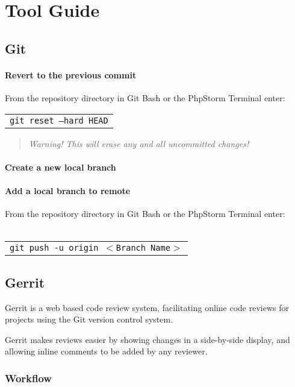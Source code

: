 
\chapter{Tool Guide}

\section{Git}

\subsubsection{Revert to the previous commit}
From the repository directory in Git Bash or the PhpStorm Terminal enter:\\

\begin{tabular}{l}
	\texttt{git reset --hard HEAD}\\
\end{tabular}

\begin{quote}
	\emph{Warning! This will erase any and all uncommitted changes!}
\end{quote}

\subsubsection{Create a new local branch}

\subsubsection{Add a local branch to remote}
From the repository directory in Git Bash or the PhpStorm Terminal enter:\\
\\
\begin{tabular}{l}
	\texttt{git push -u origin $<$Branch Name$>$}
\end{tabular}
\section{Gerrit}
\label{sec:Gerrit}

Gerrit is a web based code review system, facilitating online code reviews for projects using the Git version control system.

Gerrit makes reviews easier by showing changes in a side-by-side display, and allowing inline comments to be added by any reviewer.

\subsection{Workflow}

